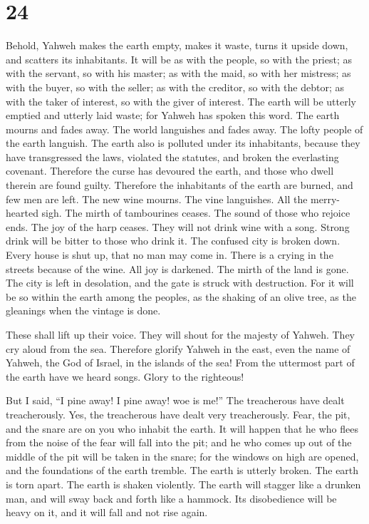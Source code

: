 \hypertarget{section-23}{%
\section{24}\label{section-23}}

 Behold, Yahweh makes the earth empty, makes it waste, turns
it upside down, and scatters its inhabitants.  It will be as
with the people, so with the priest; as with the servant, so with his
master; as with the maid, so with her mistress; as with the buyer, so
with the seller; as with the creditor, so with the debtor; as with the
taker of interest, so with the giver of interest.  The earth
will be utterly emptied and utterly laid waste; for Yahweh has spoken
this word.  The earth mourns and fades away. The world
languishes and fades away. The lofty people of the earth languish.
 The earth also is polluted under its inhabitants, because
they have transgressed the laws, violated the statutes, and broken the
everlasting covenant.  Therefore the curse has devoured the
earth, and those who dwell therein are found guilty. Therefore the
inhabitants of the earth are burned, and few men are left. 
The new wine mourns. The vine languishes. All the merry-hearted sigh.
 The mirth of tambourines ceases. The sound of those who
rejoice ends. The joy of the harp ceases.  They will not
drink wine with a song. Strong drink will be bitter to those who drink
it.  The confused city is broken down. Every house is shut
up, that no man may come in.  There is a crying in the
streets because of the wine. All joy is darkened. The mirth of the land
is gone.  The city is left in desolation, and the gate is
struck with destruction.  For it will be so within the
earth among the peoples, as the shaking of an olive tree, as the
gleanings when the vintage is done.

 These shall lift up their voice. They will shout for the
majesty of Yahweh. They cry aloud from the sea.  Therefore
glorify Yahweh in the east, even the name of Yahweh, the God of Israel,
in the islands of the sea!  From the uttermost part of the
earth have we heard songs. Glory to the righteous!

But I said, ``I pine away! I pine away! woe is me!'' The treacherous
have dealt treacherously. Yes, the treacherous have dealt very
treacherously.  Fear, the pit, and the snare are on you who
inhabit the earth.  It will happen that he who flees from
the noise of the fear will fall into the pit; and he who comes up out of
the middle of the pit will be taken in the snare; for the windows on
high are opened, and the foundations of the earth tremble. 
The earth is utterly broken. The earth is torn apart. The earth is
shaken violently.  The earth will stagger like a drunken
man, and will sway back and forth like a hammock. Its disobedience will
be heavy on it, and it will fall and not rise again.

